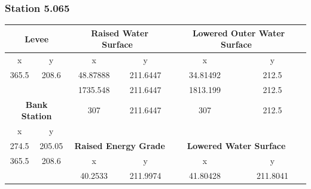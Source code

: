                 \subsubsection{Station 5.065}
            \begin{center}
            \begin{tabular}{|cc|cc|cc|} 
                \hline
                \multicolumn{2}{|c|}{\textbf{Levee}}                    & \multicolumn{2}{c|}{\textbf{Raised Water Surface~}} & \multicolumn{2}{c|}{\textbf{Lowered Outer Water Surface~}}  \\ 
                \hline
                x        & y                                            & x        & y                                        & x        & y                                                \\
                365.5    & 208.6                                        & 48.87888 & 211.6447                                 & 34.81492 & 212.5                                            \\
                         &                                              & 1735.548 & 211.6447                                 & 1813.199 & 212.5                                            \\
                \multicolumn{2}{|c|}{\textbf{Bank Station}}             & 307      & 211.6447                                 & 307      & 212.5                                            \\ 
                \cline{1-2}
                x        & y                                            &          &                                          &          &                                                  \\
                274.5    & 205.05                                       & \multicolumn{2}{c|}{\textbf{Raised Energy Grade}}   & \multicolumn{2}{c|}{\textbf{Lowered Water Surface~}}        \\ 
                \cline{3-6}
                365.5    & 208.6                                        & x        & y                                        & x        & y                                                \\
                         &                                              & 40.2533  & 211.9974                                 & 41.80428 & 211.8041                                         \\

\end{tabular}
\end{center}
